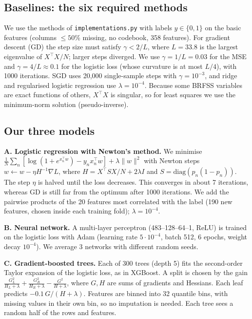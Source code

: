 \documentclass[10pt,conference,compsocconf]{IEEEtran}
\begin{document}
\subsection{Baselines: the six required methods}
We use the methods of \texttt{implementations.py} with labels $y\in\{0,1\}$ on the basic features (columns $\le 50\%$ missing, no codebook, 358 features).
For gradient descent (GD) the step size must satisfy $\gamma<2/L$, where $L=33.8$ is the largest eigenvalue of $X^\top X/N$; larger steps diverged.
We use $\gamma=1/L=0.03$ for the MSE and $\gamma=4/L\approx0.1$ for the logistic loss (whose curvature is at most $L/4$), with 1000 iterations.
SGD uses 20,000 single-sample steps with $\gamma=10^{-3}$, and ridge and regularised logistic regression use $\lambda=10^{-4}$.
Because some BRFSS variables are exact functions of others, $X^\top X$ is singular, so for least squares we use the minimum-norm solution (pseudo-inverse).

\subsection{Our three models}
\textbf{A. Logistic regression with Newton's method.}
We minimise $\frac1N\sum_n[\log(1+e^{x_n^\top w})-y_n x_n^\top w]+\lambda\|w\|^2$ with Newton steps
$w\leftarrow w-\eta H^{-1}\nabla L$, where $H=X^\top S X/N+2\lambda I$ and $S=\mathrm{diag}(p_n(1-p_n))$.
The step $\eta$ is halved until the loss decreases.
This converges in about 7 iterations, whereas GD is still far from the optimum after 1000 iterations.
We add the pairwise products of the 20 features most correlated with the label (190 new features, chosen inside each training fold); $\lambda=10^{-4}$.

\textbf{B. Neural network.}
A multi-layer perceptron (483--128--64--1, ReLU) is trained on the logistic loss with Adam (learning rate $5\cdot10^{-4}$, batch 512, 6 epochs, weight decay $10^{-4}$).
We average 3 networks with different random seeds.

\textbf{C. Gradient-boosted trees.}
Each of 300 trees (depth 5) fits the second-order Taylor expansion of the logistic loss, as in XGBoost.
A split is chosen by the gain $\frac{G_L^2}{H_L+\lambda}+\frac{G_R^2}{H_R+\lambda}-\frac{G^2}{H+\lambda}$, where $G,H$ are sums of gradients and Hessians.
Each leaf predicts $-0.1\,G/(H+\lambda)$.
Features are binned into 32 quantile bins, with missing values in their own bin, so no imputation is needed.
Each tree sees a random half of the rows and features.
\end{document}

